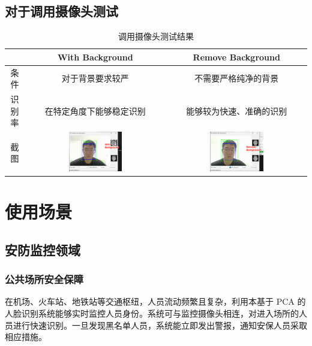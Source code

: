 \documentclass{article}
\begin{document}
\subsection{对于调用摄像头测试}

\begin{table}[H]
    \centering
    \begin{tabular}{|c|c|c|}
        \hline
        & With Background & Remove Background \\
        \hline
        条件 & 对于背景要求较严 & 不需要严格纯净的背景 \\
        \hline
        识别率 & 在特定角度下能够稳定识别 & 能够较为快速、准确的识别 \\
        \hline
        截图 & \includegraphics[width=0.4\textwidth]{Img/PixPin_2025-03-09_11-53-03.png} & \includegraphics[width=0.4\textwidth]{Img/PixPin_2025-03-09_11-54-41.png} \\
        \hline
    \end{tabular}
    \caption{调用摄像头测试结果}
\end{table}
\newpage
\section{使用场景}

\subsection{安防监控领域}

\subsubsection{公共场所安全保障}
在机场、火车站、地铁站等交通枢纽，人员流动频繁且复杂，利用本基于 PCA 的人脸识别系统能够实时监控人员身份。系统可与监控摄像头相连，对进入场所的人员进行快速识别。一旦发现黑名单人员，系统能立即发出警报，通知安保人员采取相应措施。
\end{document}
